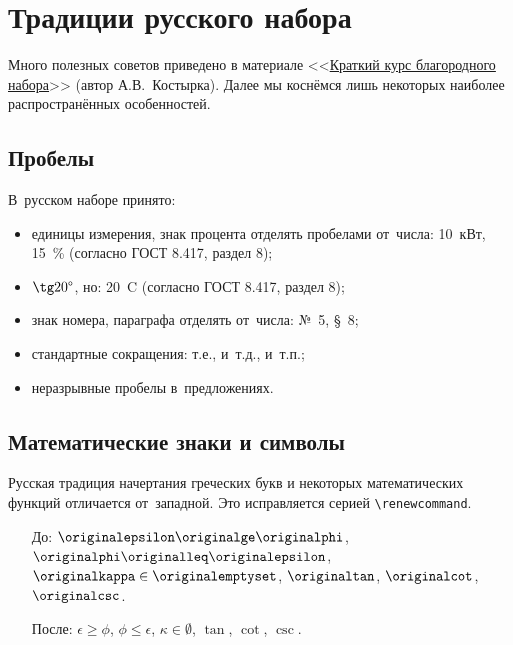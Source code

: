 \section{Традиции русского набора}

Много полезных советов приведено в материале
<<\href{https://kostyrka.ru/main/ru/typesetting-and-typography-crash-course-by-kostyrka/}{Краткий курс благородного набора}>>
(автор А.\:В.~Костырка).
Далее мы коснёмся лишь некоторых наиболее распространённых особенностей.

\subsection{Пробелы}

В~русском наборе принято:
\begin{itemize}
    \item единицы измерения, знак процента отделять пробелами от~числа:
          10~кВт, 15~\% (согласно ГОСТ 8.417, раздел 8);
    \item \(\tg 20\text{\textdegree}\), но: 20~{\textdegree}C
          (согласно ГОСТ 8.417, раздел 8);
    \item знак номера, параграфа отделять от~числа: №~5, \S~8;
    \item стандартные сокращения: т.\:е., и~т.\:д., и~т.\:п.;
    \item неразрывные пробелы в~предложениях.
\end{itemize}

\subsection{Математические знаки и символы}

Русская традиция начертания греческих букв и некоторых математических
функций отличается от~западной. Это исправляется серией
\verb|\renewcommand|.
\begin{itemize}
    \item[До:] \( \originalepsilon \originalge \originalphi\),
          \(\originalphi \originalleq \originalepsilon\),
          \(\originalkappa \in \originalemptyset\),
          \(\originaltan\),
          \(\originalcot\),
          \(\originalcsc\).
    \item[После:] \( \epsilon \ge \phi\),
          \(\phi \leq \epsilon\),
          \(\kappa \in \emptyset\),
          \(\tan\),
          \(\cot\),
          \(\csc\).
\end{itemize}

